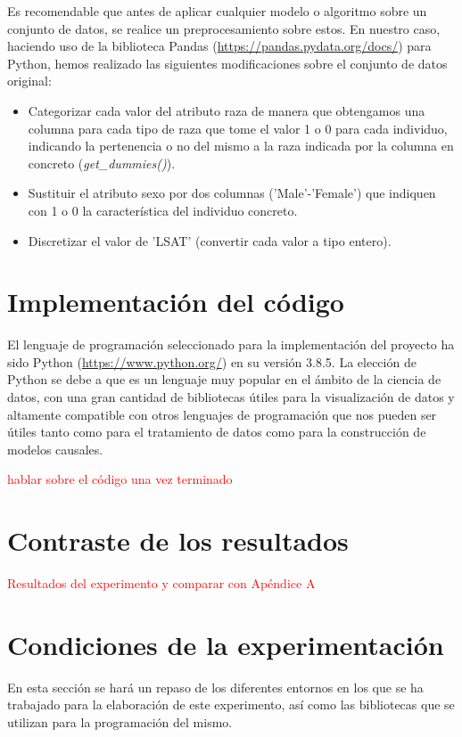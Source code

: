 \documentclass[oneside,openright,titlepage,numbers=noenddot,openany,headinclude,footinclude=true,
cleardoublepage=empty,abstractoff,BCOR=5mm,paper=a4,fontsize=12pt,main=spanish]{scrreprt}
\begin{document}
Es recomendable que antes de aplicar cualquier modelo o algoritmo sobre un conjunto de datos, se realice un preprocesamiento sobre estos. En nuestro caso, haciendo uso de la biblioteca Pandas (\url{https://pandas.pydata.org/docs/}) para Python, hemos realizado las siguientes modificaciones sobre el conjunto de datos original:

\begin{itemize}
    \item Categorizar cada valor del atributo raza de manera que obtengamos una columna para cada tipo de raza que tome el valor 1 o 0 para cada individuo, indicando la pertenencia o no del mismo a la raza indicada por la columna en concreto (\textit{get\_dummies()}).
    \item Sustituir el atributo sexo por dos columnas ('Male'-'Female') que indiquen con 1 o 0 la característica del individuo concreto.
    \item Discretizar el valor de 'LSAT' (convertir cada valor a tipo entero).
\end{itemize}

\section{Implementación del código}

El lenguaje de programación seleccionado para la implementación del proyecto ha sido Python (\url{https://www.python.org/}) en su versión 3.8.5. La elección de Python se debe a que es un lenguaje muy popular en el ámbito de la ciencia de datos, con una gran cantidad de bibliotecas útiles para la visualización de datos y altamente compatible con otros lenguajes de programación que nos pueden ser útiles tanto como para el tratamiento de datos como para la construcción de modelos causales.

\textcolor{red}{hablar sobre el código una vez terminado}

\section{Contraste de los resultados}

\textcolor{red}{Resultados del experimento y comparar con Apéndice A}

\section{Condiciones de la experimentación}

En esta sección se hará un repaso de los diferentes entornos en los que se ha trabajado para la elaboración de este experimento, así como las bibliotecas que se utilizan para la programación del mismo.
\end{document}
